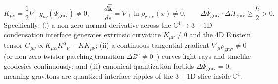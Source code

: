 \documentclass[11pt,a4paper]{article}
\begin{document}
\begin{enumerate}
\begin{equation}
    K_{\mu\nu} = \frac{1}{2}\nabla_{\!\perp} g_{\mu\nu}(\Psi_{\text{grav}}) \neq 0, \qquad \frac{d\hat{\mathbf{k}}}{ds} = \nabla_\perp \ln \rho_{\text{grav}}(x) \neq 0, \qquad \Delta \hat{\Psi}_{\text{grav}} \cdot \Delta \hat{\Pi}_{\text{grav}} \ge \frac{\hbar}{2} > 0.
    \end{equation}
    Specifically: (i) a non-zero normal derivative across the $\mathbb{C}^4 \to 3+1\text{D}$ condensation interface generates extrinsic curvature $K_{\mu\nu} \neq 0$ and the 4D Einstein tensor $G_{\mu\nu} \propto K_{\mu\alpha}K^\alpha{}_\nu - K K_{\mu\nu}$; (ii) a continuous tangential gradient $\nabla_\mu \rho_{\text{grav}} \neq 0$ (or non-zero twistor patching transition $\Delta Z^\alpha \neq 0$~\cite{PenroseRindler1984,Newman1976}) curves light rays and timelike geodesics continuously; and (iii) canonical quantization forbids $\Delta \hat{\Psi}_{\text{grav}} = 0$, meaning gravitons are quantized interface ripples of the $3+1\text{D}$ slice inside $\mathbb{C}^4$.
\end{enumerate}
\end{document}
